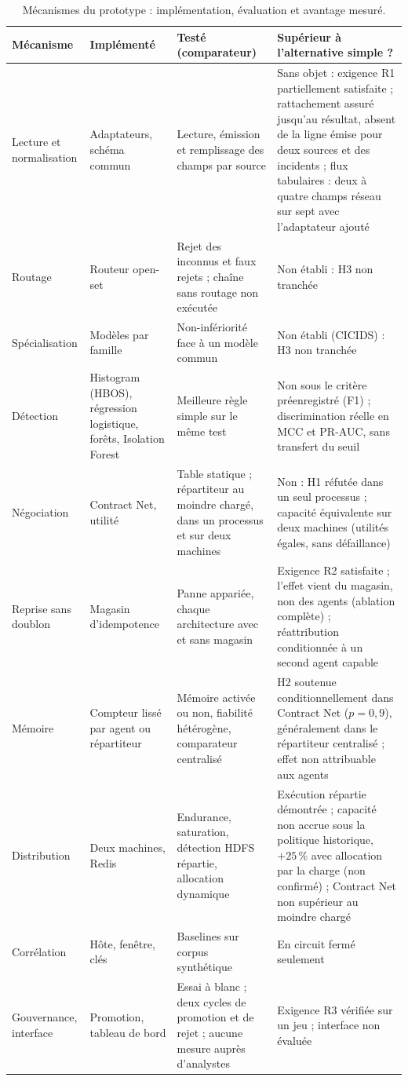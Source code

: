 \begin{table}[tbp]
\centering
\caption{Mécanismes du prototype : implémentation, évaluation et avantage mesuré.}
\label{tab:synthese-mecanismes}
\footnotesize
\begin{tabularx}{\textwidth}{p{} p{} p{} X}
\toprule
\textbf{Mécanisme} & \textbf{Implémenté} & \textbf{Testé (comparateur)} & \textbf{Supérieur à l'alternative simple ?} \\
\midrule
Lecture et normalisation & Adaptateurs, schéma commun & Lecture, émission et remplissage des champs par source & Sans objet : exigence R1 partiellement satisfaite ; rattachement assuré jusqu'au résultat, absent de la ligne émise pour deux sources et des incidents ; flux tabulaires : deux à quatre champs réseau sur sept avec l'adaptateur ajouté \\
Routage & Routeur open-set & Rejet des inconnus et faux rejets ; chaîne sans routage non exécutée & Non établi : H3 non tranchée \\
Spécialisation & Modèles par famille & Non-infériorité face à un modèle commun & Non établi (CICIDS) : H3 non tranchée \\
Détection & Histogram (HBOS), régression logistique, forêts, Isolation Forest & Meilleure règle simple sur le même test & Non sous le critère préenregistré (F1) ; discrimination réelle en MCC et PR-AUC, sans transfert du seuil \\
Négociation & Contract Net, utilité & Table statique ; répartiteur au moindre chargé, dans un processus et sur deux machines & Non : H1 réfutée dans un seul processus ; capacité équivalente sur deux machines (utilités égales, sans défaillance) \\
Reprise sans doublon & Magasin d'idempotence & Panne appariée, chaque architecture avec et sans magasin & Exigence R2 satisfaite ; l'effet vient du magasin, non des agents (ablation complète) ; réattribution conditionnée à un second agent capable \\
Mémoire & Compteur lissé par agent ou répartiteur & Mémoire activée ou non, fiabilité hétérogène, comparateur centralisé & H2 soutenue conditionnellement dans Contract Net ($p=0{,}9$), généralement dans le répartiteur centralisé ; effet non attribuable aux agents \\
Distribution & Deux machines, Redis & Endurance, saturation, détection HDFS répartie, allocation dynamique & Exécution répartie démontrée ; capacité non accrue sous la politique historique, $+25\,\%$ avec allocation par la charge (non confirmé) ; Contract Net non supérieur au moindre chargé \\
Corrélation & Hôte, fenêtre, clés & Baselines sur corpus synthétique & En circuit fermé seulement \\
Gouvernance, interface & Promotion, tableau de bord & Essai à blanc ; deux cycles de promotion et de rejet ; aucune mesure auprès d'analystes & Exigence R3 vérifiée sur un jeu ; interface non évaluée \\
\bottomrule
\end{tabularx}
\end{table}

